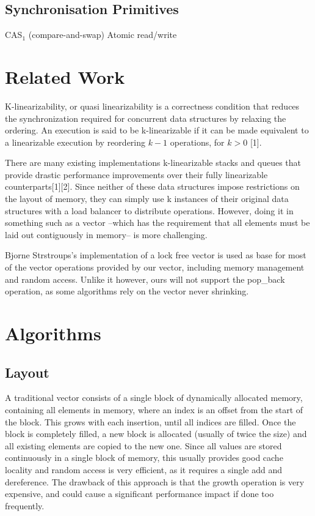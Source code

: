 \documentclass{sigplanconf}
\begin{document}
\subsection{Synchronisation Primitives}
CAS$_1$ (compare-and-swap)
Atomic read/write

\section{Related Work}

K-linearizability, or quasi linearizability is a correctness condition
that reduces the synchronization required for concurrent data structures
by relaxing the ordering. An execution is said to be k-linearizable
if it can be made equivalent to a linearizable execution by reordering
$k-1$ operations, for $k>0$ {[}1{]}.

There are many existing implementations k-linearizable stacks and
queues that provide drastic performance improvements over their fully
linearizable counterparts{[}1{]}{[}2{]}. Since neither of these data
structures impose restrictions on the layout of memory, they can simply
use k instances of their original data structures with a load balancer
to distribute operations. However, doing it in something such as a
vector --which has the requirement that all elements must be laid
out contiguously in memory-- is more challenging.

Bjorne Strstroups's implementation of a lock free vector is used as
base for most of the vector operations provided by our vector, including
memory management and random access. Unlike it however, ours will
not support the pop\_back operation, as some algorithms rely on the
vector never shrinking.


\section{Algorithms}

\subsection{Layout}
A traditional vector consists of a single block of dynamically allocated memory, containing all elements in memory, where an index is an offset from the start of the block. This grows with each insertion, until all indices are filled. Once the block is completely filled, a new block is allocated (usually of twice the size) and all existing elements are copied to the new one. Since all values are stored continuously in a single block of memory, this usually provides good cache locality and random access is very efficient, as it requires a single add and dereference. The drawback of this approach is that the growth operation is very expensive, and could cause a significant performance impact if done too frequently.
\end{document}

